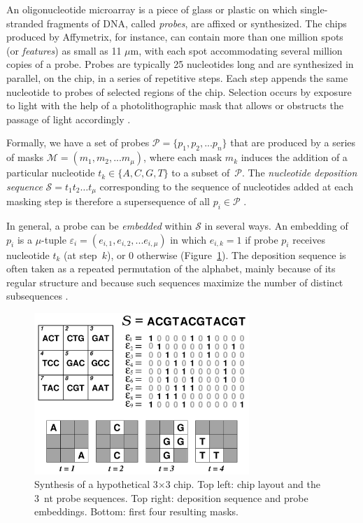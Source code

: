 \documentclass[english]{lni}
\begin{document}
An oligonucleotide microarray is a piece of glass or plastic on which
single-stranded fragments of DNA, called \emph{probes}, are affixed or
synthesized. The chips produced by Affymetrix, for instance, can contain more
than one million spots (or \emph{features}) as small as 11 $\mu$m, with each
spot accommodating several million copies of a probe. Probes are typically 25
nucleotides long and are synthesized in parallel, on the chip, in a series of
repetitive steps. Each step appends the same nucleotide to probes of selected
regions of the chip. Selection occurs by exposure to light with the help of a
photolithographic mask that allows or obstructs the passage of light
accordingly \cite{FODOR91}.

Formally, we have a set of probes $\mathcal{P} = \{p_{1}, p_{2}, ... p_{n}\}$
that are produced by a series of masks
$\mathcal{M} = (m_{1}, m_{2}, ... m_{\mu})$, where each mask $m_{k}$ induces the
addition of a particular nucleotide $t_{k} \in \{A, C, G, T\}$ to a subset
of~$\mathcal{P}$. The \emph{nucleotide deposition sequence}
$\mathcal{S} = t_{1} t_{2} \ldots t_{\mu}$ corresponding to the sequence of
nucleotides added at each masking step is therefore a supersequence of all
$p_{i} \in \mathcal{P}$ \cite{RAHMANN03}.

In general, a probe can be \emph{embedded} within $\mathcal{S}$ in several ways.
An embedding of $p_{i}$ is a $\mu$-tuple
$\varepsilon_{i} = (e_{i,1}, e_{i,2}, ... e_{i,\mu})$ in which $e_{i,k} = 1$ if
probe $p_{i}$ receives nucleotide $t_{k}$ (at step~$k$), or 0 otherwise
(Figure~\ref{fig:masking_process}).
The deposition sequence is often taken as a repeated permutation of the
alphabet, mainly because of its regular structure and because such sequences
maximize the number of distinct subsequences \cite{CHASE76}.  

\begin{figure}
\centerline{\includegraphics[width=230pt]{chip}}
\caption{Synthesis of a hypothetical 3$\times$3 chip. Top left: chip
layout and the 3~nt probe sequences. Top right: deposition
sequence and probe embeddings. Bottom: first four resulting masks.}
\label{fig:masking_process}
\end{figure}
\end{document}
